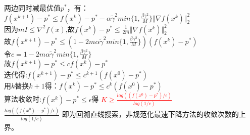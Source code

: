 \documentclass{article}
\begin{document}
两边同时减最优值$p^*$，有：\\
$f(x^{k+1}) - p^* \leq f(x^k) - p^* - \alpha \tilde{\gamma}^2 min\{ 1, \frac{\beta \gamma ^2}{M}\} \Vert \nabla f(x^k) \Vert_2 ^2$\\
因为$mI \leq \nabla^2 f(x)$,故$f(x^k) - p^* \leq \frac{1}{2m}\Vert \nabla f(x^k) \Vert_2 ^2$\\
故$f(x^{k+1}) - p^* \leq (1 - 2m \alpha \tilde{\gamma} ^2 min\{1,\frac{\beta \gamma ^2 }{M}\})(f(x^k) - p^*)$\\
令$c = 1 - 2m \alpha \tilde{\gamma} ^2 min\{1,\frac{\beta \gamma ^2 }{M}\}$\\
故$f(x^{k+1}) -p^* \leq c f(x^k) - p^*$\\
迭代得:$f(x^{k+1})-p^* \leq c^{k+1} (f(x^0) - p^*)$\\
用$k$替换$k+1$得：$f(x^k) -p^* \leq c^k (f(x^0) - p^*)$\\
算法收敛时:$f(x^k) -p^* \leq \epsilon$得 \textcolor{red}{$K \geq \frac{log((f(x^0) - p^*)/\epsilon)}{log(1/c)}$}\\
$\frac{log((f(x^0) - p^*)/\epsilon)}{log(1/c)}$ 即为回溯直线搜索，非规范化最速下降方法的收敛次数的上界。\\
\end{document}
